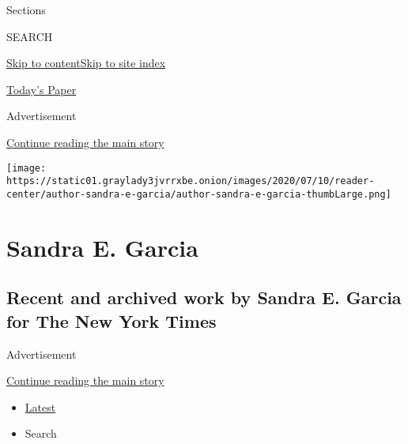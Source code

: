 Sections

SEARCH

\protect\hyperlink{site-content}{Skip to
content}\protect\hyperlink{site-index}{Skip to site index}

\href{https://myaccount.nytimes3xbfgragh.onion/auth/login?response_type=cookie\&client_id=vi}{}

\href{https://www.nytimes3xbfgragh.onion/section/todayspaper}{Today's
Paper}

Advertisement

\protect\hyperlink{after-top}{Continue reading the main story}

\texttt{[image: https://static01.graylady3jvrrxbe.onion/images/2020/07/10/reader-center/author-sandra-e-garcia/author-sandra-e-garcia-thumbLarge.png]}

\hypertarget{sandra-e-garcia}{%
\section{Sandra E. Garcia}\label{sandra-e-garcia}}

\hypertarget{recent-and-archived-work-by-sandra-e-garcia-for-the-new-york-times}{%
\subsection{Recent and archived work by Sandra E. Garcia for The New
York
Times}\label{recent-and-archived-work-by-sandra-e-garcia-for-the-new-york-times}}

Advertisement

\protect\hyperlink{after-mid1}{Continue reading the main story}

\begin{itemize}
\tightlist
\item
  \protect\hyperlink{stream-panel}{Latest}
\item
  Search
\end{itemize}

